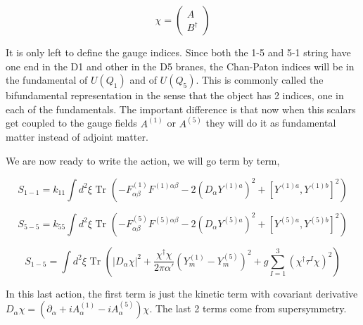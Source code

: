 \begin{equation}
    \chi=\begin{pmatrix}A\\B^\dagger\end{pmatrix}
\end{equation}

It is only left to define the gauge indices. Since both the 1-5 and 5-1 string have one end in the D1 and other in the D5 branes, the Chan-Paton indices will be in the fundamental of $U(Q_1)$ and of $U(Q_5)$. This is commonly called the bifundamental representation in the sense that the object has 2 indices, one in each of the fundamentals. The important difference is that now when this scalars get coupled to the gauge fields $A^{(1)}$ or $A^{(5)}$ they will do it as fundamental matter instead of adjoint matter.

We are now ready to write the action, we will go term by term,

\begin{equation}
    S_{1-1}=k_{11} \int d^{2}\xi\text{ Tr }(-F^{(1)}_{\alpha\beta}F^{(1) \alpha\beta}-2(D_\alpha Y^{(1)a})^2+[Y^{(1)a},Y^{(1)b}]^2)
\end{equation}

\begin{equation}
    S_{5-5}=k_{55} \int d^{2}\xi\text{ Tr }(-F^{(5)}_{\alpha\beta}F^{(5) \alpha\beta}-2(D_\alpha Y^{(5)a})^2+[Y^{(5)a},Y^{(5)b}]^2)
\end{equation}

\begin{equation}
    S_{1-5} = \int d^2\xi \text{ Tr } \left( |D_\alpha \chi|^2 + \frac{\chi^\dagger \chi}{2\pi \alpha'} (Y^{(1)}_m - Y^{(5)}_m)^2 + g \sum_{I = 1}^3 (\chi^\dagger \tau^I \chi)^2\right)
\end{equation}

In this last action, the first term is just the kinetic term with covariant derivative $D_\alpha \chi = (\partial_\alpha + i A^{(1)}_\alpha - i A^{(5)}_\alpha) \chi$. The last 2 terms come from supersymmetry.